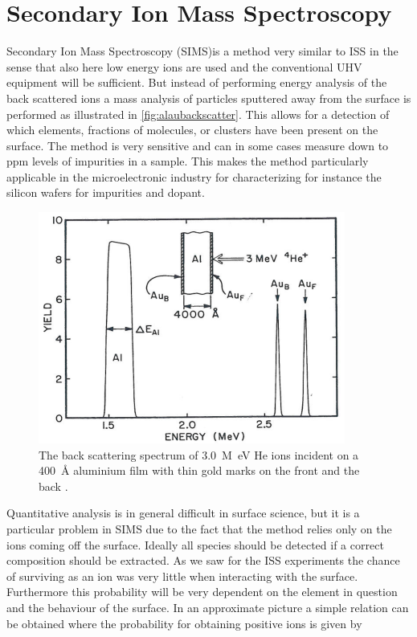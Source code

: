 \section{Secondary Ion Mass Spectroscopy}
Secondary Ion Mass Spectroscopy (SIMS)is a method very similar to ISS in the sense that also here low energy ions are used and the conventional UHV equipment will be sufficient. But instead of performing energy analysis of the back scattered ions a mass analysis of particles sputtered away from the surface is performed as illustrated in \autoref{fig:alaubackscatter}. This allows for a detection of which elements, fractions of molecules, or clusters have been present on the surface. The method is very sensitive and can in some cases measure down to ppm levels of impurities in a sample. This makes the method particularly applicable in the microelectronic industry for characterizing for instance the silicon wafers for impurities and dopant.

\begin{figure}[h!]
	\begin{center}
	\includegraphics[scale=4]{figures/11_05.png}
	\caption{The back scattering spectrum of \SI{3.0}{M\electronvolt} He ions incident on a \SI{400}{\angstrom} aluminium film with thin gold marks on the front and the back \cite{feldman}.}
	\label{fig:alaubackscatter}
	\end{center}
\end{figure}

Quantitative analysis is in general difficult in surface science, but it is a particular problem in SIMS due to the fact that the method relies only on the ions coming off the surface. Ideally all species should be detected if a correct composition should be extracted. As we saw for the ISS experiments the chance of surviving as an ion was very little when interacting with the surface. Furthermore this probability will be very dependent on the element in question and the behaviour of the surface. In an approximate picture a simple relation can be obtained \cite{Norskovlang} where the probability for obtaining positive ions is given by

